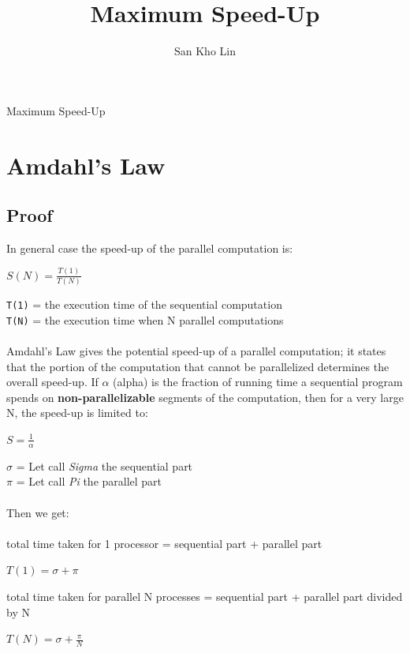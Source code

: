 \documentclass[a4paper]{article}
\title{Maximum Speed-Up}
\author{San Kho Lin}
\date{}
\begin{document}

\noindent
{\huge Maximum Speed-Up}


\section{Amdahl's Law}
\subsection{Proof}
In general case the speed-up of the parallel computation is:

\begin{center}
{\Large $S(N) = \frac{T(1)}{T(N)}$}
\end{center}
\verb|T(1)| = the execution time of the sequential computation
\\
\verb|T(N)| = the execution time when N parallel computations
\\
\\
\noindent
Amdahl's Law gives the potential speed-up of a parallel computation; it
states that the portion of the computation that cannot be parallelized determines the overall speed-up. If $\alpha$ (alpha) is the fraction of running time a sequential program spends on \textbf{non-parallelizable} segments of the computation, then for a very large N, the speed-up is limited to:

\begin{center}
{\Large $S = \frac{1}{\alpha}$}
\end{center}

\noindent
$\sigma$ = Let call \textit{Sigma} the sequential part
\\
$\pi$ = Let call \textit{Pi} the parallel part
\\
\\
Then we get:
\\
\\
total time taken for 1 processor = sequential part + parallel part
\begin{center}
{\Large $T(1) =  \sigma + \pi$}
\end{center}
total time taken for parallel N processes = sequential part + parallel part divided by N
\\
\begin{center}
{\Large $T(N) = \sigma + \frac{\pi}{N}$}
\end{center}
\end{document}
